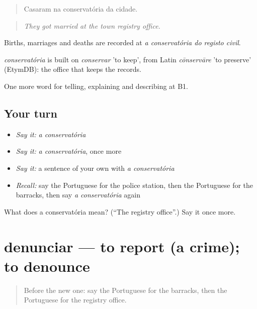 \begin{quote}
Casaram na conservatória da cidade.
\end{quote}

\begin{quote}
\emph{They got married at the town registry office.}
\end{quote}

Births, marriages and deaths are recorded at \emph{a conservatória do registo civil}.

\begin{cousinweb}
\emph{conservatória} is built on \emph{conservar} 'to keep', from Latin \emph{cōnservāre} 'to preserve' (EtymDB): the office that keeps the records.
\end{cousinweb}

\begin{grammarlens}[title={What you've built}]
One more word for telling, explaining and describing at B1.
\end{grammarlens}

\subsection*{Your turn}
\begin{itemize}
\raggedright
  \item \emph{Say it:} \emph{a conservatória}
  \item \emph{Say it:} \emph{a conservatória}, once more
  \item \emph{Say it:} a sentence of your own with \emph{a conservatória}
  \item \emph{Recall:} say the Portuguese for the police station, then the Portuguese for the barracks, then say \emph{a conservatória} again
\end{itemize}

\begin{tcolorbox}[breakable,colback=teal!4,colframe=teal!35!black,title={Before you move on}]
What does a conservatória mean? (\textquotedblleft{}The registry office\textquotedblright{}.) Say it once more.
\end{tcolorbox}
\section[denunciar]{denunciar — to report (a crime); to denounce}

\label{lesson:PT-C443-denunciar}



\begin{quote}
Before the new one: say the Portuguese for the barracks, then the Portuguese for the registry office.
\end{quote}

